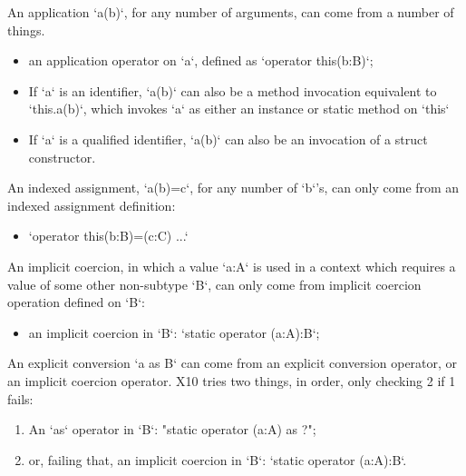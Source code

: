 An application \xcd`a(b)`, for any number of arguments, can come from a number
of things. 
\begin{itemize}
\item an application operator on \xcd`a`, defined as \xcd`operator this(b:B)`;
\item If \xcd`a` is an identifier, \xcd`a(b)` can also be a method invocation
      equivalent to \xcd`this.a(b)`, which  invokes \xcd`a` as
      either an instance or static method on \xcd`this`
\item If \xcd`a` is a qualified identifier, \xcd`a(b)` can also be an
      invocation of a struct constructor.
\end{itemize}


An indexed assignment, \xcd`a(b)=c`, for any number of \xcd`b`'s, can only
come from an indexed assignment definition: 
\begin{itemize}
\item \xcd`operator this(b:B)=(c:C) {...}`
\end{itemize}

An implicit coercion, in 
which a value \xcd`a:A` is used in a context which requires a value of some
other non-subtype \xcd`B`, 
can only come from implicit coercion operation defined on
\xcd`B`: 
\begin{itemize}
\item an implicit coercion in \xcd`B`:
      \xcd`static operator (a:A):B`;
\end{itemize}

An explicit conversion \xcd`a as B` can come from an explicit conversion
operator, or an implicit coercion operator.  X10 tries two things, in order,
only checking 2 if 1 fails: 
\begin{enumerate}
\item An \xcd`as` operator in \xcd`B`: 
      \xcdmath"static operator (a:A) as ?";

\item or, failing that, an implicit coercion in \xcd`B`:
      \xcd`static operator (a:A):B`.

\end{enumerate}



